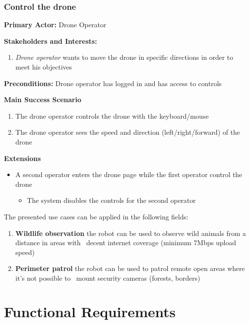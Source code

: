 \subsubsection{Control the drone}

\textbf{Primary Actor:} Drone Operator

\textbf{Stakeholders and Interests:}
\begin{enumerate}
    \item \textit{Drone operator} wants to move the drone in specific directions in order to meet his objectives
\end{enumerate}

\textbf{Preconditions:} Drone operator has logged in and has access to controls

\textbf{Main Success Scenario}
\begin{enumerate}
    \item The drone operator controls the drone with the keyboard/mouse
    \item The drone operator sees the speed and direction (left/right/forward) of the drone
\end{enumerate}

\textbf{Extensions}
\begin{itemize}
    \item A second operator enters the drone page while the first operator control the drone
            \begin{itemize}
                \item The system disables the controls for the second operator
            \end{itemize}
\end{itemize}

The presented use cases can be applied in the following fields:
\begin{enumerate}
    \item \textbf{Wildlife observation} the robot can be used to observe wild animals from a distance in areas with \
        decent internet coverage (minimum 7Mbps upload speed)
    \item \textbf{Perimeter patrol} the robot can be used to patrol remote open areas where it's not possible to \
        mount security cameras (forests, borders)
\end{enumerate}


\section{Functional Requirements}
\label{sec:functional-requirements}

